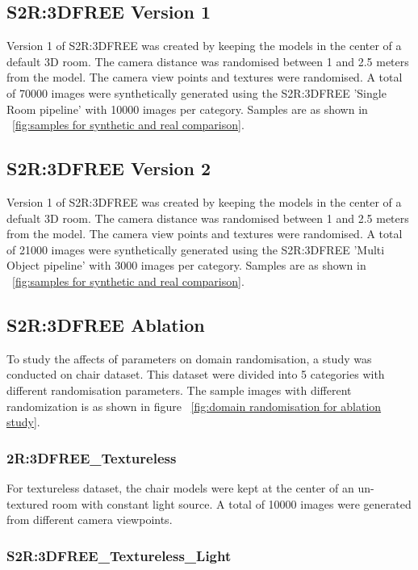 \subsection{S2R:3DFREE Version 1}
Version 1 of S2R:3DFREE was created by keeping the models in the center of a default 3D room.
The camera distance was randomised between 1 and 2.5 meters from the model.
The camera view points and textures were randomised.
A total of 70000 images were synthetically generated using the S2R:3DFREE 'Single Room pipeline' with 10000 images per category.
Samples are as shown in ~\ref{fig:samples for synthetic and real comparison}.

\subsection{S2R:3DFREE Version 2}
Version 1 of S2R:3DFREE was created by keeping the models in the center of a defualt 3D room.
The camera distance was randomised between 1 and 2.5 meters from the model.
The camera view points and textures were randomised.
A total of 21000 images were synthetically generated using the S2R:3DFREE 'Multi Object pipeline' with 3000 images per category.
Samples are as shown in ~\ref{fig:samples for synthetic and real comparison}.

\subsection{S2R:3DFREE Ablation}\label{subsec:s2r:3dfree-ablation}
To study the affects of parameters on domain randomisation, a study was conducted on chair dataset.
This dataset were divided into 5 categories with different randomisation parameters.
The sample images with different randomization is as shown in figure ~\ref{fig:domain randomisation for ablation study}.

\subsubsection{2R:3DFREE\_Textureless}

    For textureless dataset, the chair models were kept at the center of an un-textured room with constant light source.
    A total of 10000 images were generated from different camera viewpoints.

\subsubsection{S2R:3DFREE\_Textureless\_Light}

